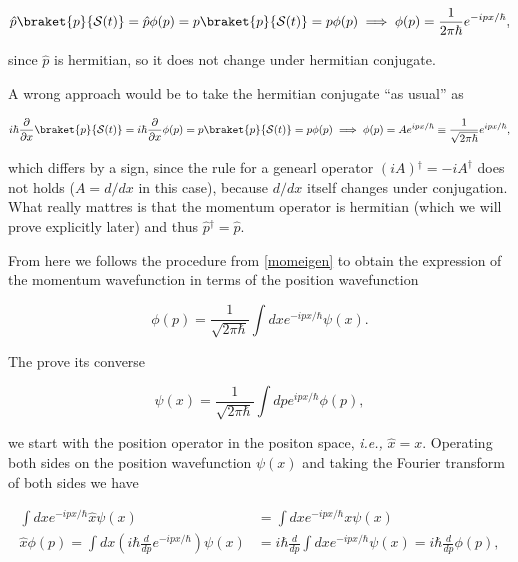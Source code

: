 \documentclass[a4paper,12pt]{report}
\begin{document}
\begin{equation}
  \hat{p} \braket{p}{\mathcal{S}(t)} = \hat{p} \phi (p) = p \braket{p}{\mathcal{S}(t)} = p \phi (p) \implies \phi (p) = \frac{1}{2\pi \hbar } e^{-ipx /\hbar },    
\end{equation}

since \(\hat{p} \) is hermitian, so it does not change under hermitian conjugate.

A wrong approach would be to take the hermitian conjugate ``as usual'' as

\begin{equation}
 i \hbar \frac{\partial }{\partial x} \braket{p}{\mathcal{S}(t)} = i \hbar \frac{\partial }{\partial x} \phi (p) = p \braket{p}{\mathcal{S}(t)} = p \phi (p) \implies \phi (p) = Ae^{ipx /\hbar } \equiv \frac{1}{\sqrt{2\pi \hbar } }e^{ipx /\hbar },
\end{equation}

which differs by a sign, since the rule for a genearl operator \((iA){}^{\dagger} = - iA^{\dagger} \) does not holds (\(A = d/dx\) in this case), because \(d/dx\) itself changes under conjugation. What really mattres is that the momentum operator is hermitian (which we will prove explicitly later) and thus \(\hat{p} {}^{\dagger} = \hat{p} \). 

From here we follows the procedure from \cref{momeigen} to obtain the expression of the momentum wavefunction in terms of the position wavefunction

\begin{equation}
  \phi (p) = \frac{1}{\sqrt{2\pi \hbar } } \int dx e^{-ipx /\hbar }\psi (x).  
\end{equation}

The prove its converse

\begin{equation}
  \psi (x) = \frac{1}{\sqrt{2\pi \hbar } } \int dp e^{ipx/\hbar } \phi (p),  
\end{equation}

we start with the position operator in the positon space, \textit{i.e.,} \(\hat{x} = x\). Operating both sides on the position wavefunction \(\psi (x)\) and taking the Fourier transform of both sides we have 

\begin{equation}
  \begin{aligned} 
  \int dxe^{-ipx /\hbar }\hat{x} \psi (x) &= \int dxe^{-ipx /\hbar }x \psi (x)\\
  \hat{x} \phi (p) = \int dx \left( i \hbar \frac{d}{dp} e^{-ipx /\hbar }  \right) \psi (x) &= i \hbar \frac{d}{dp} \int dx e^{-ipx /\hbar } \psi (x) = i \hbar \frac{d}{dp} \phi (p),
  \end{aligned} 
\end{equation}
\end{document}
